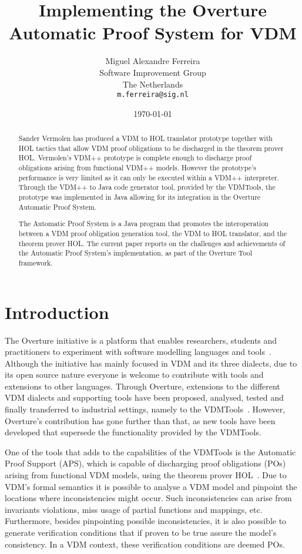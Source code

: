 \documentclass[]{article}
\title{Implementing the Overture Automatic Proof System for VDM}
\author{Miguel Alexandre Ferreira\\
        Software Improvement Group\\
		The Netherlands\\ 
		\texttt{m.ferreira@sig.nl}}
\date{\today}
\begin{document}
\maketitle
\begin{abstract}
Sander Vermolen has produced a VDM to HOL translator prototype together with HOL tactics that allow VDM proof obligations to be discharged in the theorem prover HOL.
Vermolen's VDM++ prototype is complete enough to discharge proof obligations arising from functional VDM++ models.
However the prototype's performance is very limited as it can only be executed within a VDM++ interpreter.
Through the VDM++ to Java code generator tool, provided by the VDMTools, the prototype was implemented in Java allowing for its integration in the Overture Automatic Proof System.

The Automatic Proof System is a Java program that promotes the interoperation between a VDM proof obligation generation tool, the VDM to HOL translator, and the theorem prover HOL.
The current paper reports on the challenges and achievements of the Automatic Proof System's implementation, as part of the Overture Tool framework.
\end{abstract}

\section{Introduction}
\label{sec:introduction}

The Overture initiative is a platform that enables researchers, students and practitioners to experiment with software modelling languages and tools~\cite{OverturePaper}.
Although the initiative has mainly focused in VDM and its three dialects, due to its open source nature everyone is welcome to contribute with tools and extensions to other languages.
Through Overture, extensions to the different VDM dialects and supporting tools have been proposed, analysed, tested and finally transferred to industrial settings, namely to the VDMTools~\cite{VDMTools}.
However, Overture's contribution has gone further than that, as new tools have been developed that supersede the functionality provided by the VDMTools.

One of the tools that adds to the capabilities of the VDMTools is the Automatic Proof Support (APS), which is capable of discharging proof obligations (POs) arising from functional VDM models, using the theorem prover HOL~\cite{HOL}.
Due to VDM's formal semantics it is possible to analyse a VDM model and pinpoint the locations where inconsistencies might occur.
Such inconsistencies can arise from invariants violations, miss usage of partial functions and mappings, etc.
Furthermore, besides pinpointing possible inconsistencies, it is also possible to generate verification conditions that if proven to be true assure the model's consistency.
In a VDM context, these verification conditions are deemed POs.
\end{document}
